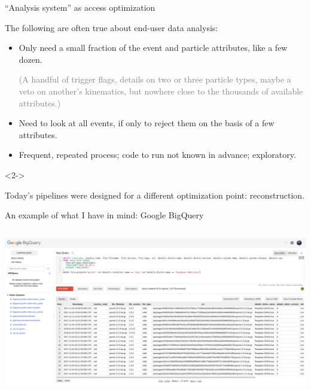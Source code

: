 \documentclass[aspectratio=169]{beamer}
\begin{document}
\begin{frame}{``Analysis system'' as access optimization}
\vspace{0.25 cm}
\begin{block}{The following are often true about end-user data analysis:}
\begin{itemize}\setlength{\itemsep}{0.35 cm}
\item Only need a small fraction of the event and particle attributes, like a few dozen.

\vspace{0.1 cm}
\textcolor{gray}{(A handful of trigger flags, details on two or three particle types, maybe a veto on another's kinematics, but nowhere close to the thousands of available attributes.)}

\item Need to look at all events, if only to reject them on the basis of a few attributes.

\item Frequent, repeated process; code to run not known in advance; exploratory.
\end{itemize}
\end{block}

\begin{uncoverenv}<2->\begin{block}{Today's pipelines were designed for a different optimization point: reconstruction.}
\vspace{0.25 cm}
\end{block}
\end{uncoverenv}
\end{frame}

\begin{frame}{An example of what I have in mind: Google BigQuery}
\vspace{0.25 cm}
\begin{columns}
\includegraphics[width=\linewidth]{bigquery.png}
\end{columns}
\end{frame}
\end{document}
